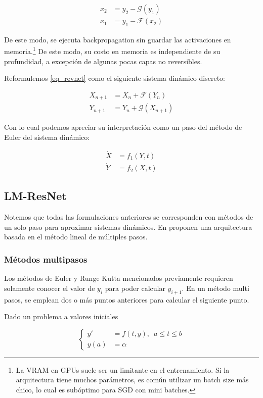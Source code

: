 \documentclass[titlepage,a4paper,oneside]{article}
\begin{document}
\begin{align}
	x_2 &= y_2 - \mathscr{G}(y_1) \\
	x_1 &= y_1 - \mathscr{F}(x_2)
\end{align}

De este modo, se ejecuta backpropagation sin guardar las activaciones en memoria.\footnote{La VRAM en GPUs suele ser un limitante en el entrenamiento. Si la arquitectura tiene muchos parámetros, es común utilizar un batch size más chico, lo cual es subóptimo para SGD con mini batches.} De este modo, su costo en memoria es independiente de su profundidad, a excepción de algunas pocas capas no reversibles.

Reformulemos \ref{eq_revnet} como el siguiente sistema dinámico discreto:

\begin{align}
	X_{n+1} &= X_n + \mathscr{F}(Y_n) \\
	Y_{n+1} &= Y_n + \mathscr{G}(X_{n+1})
\end{align}

Con lo cual podemos apreciar su interpretación como un paso del método de Euler del sistema dinámico:

\begin{align}
	\dot{X} &= f_1(Y, t) \\
	\dot{Y} &= f_2(X, t)
\end{align}

\subsection{LM-ResNet}
Notemos que todas las formulaciones anteriores se corresponden con métodos de un solo paso para aproximar sistemas dinámicos. En \cite{lu18d} proponen una arquitectura basada en el método lineal de múltiples pasos.

\subsubsection{Métodos multipasos}
Los métodos de Euler y Runge Kutta mencionados previamente requieren solamente conocer el valor de $y_i$ para poder calcular $y_{i+1}$. En un método multi pasos, se emplean dos o más puntos anteriores para calcular el siguiente punto.

Dado un problema a valores iniciales

\begin{equation}
\left\{ \begin{aligned}
		y\prime &= f(t,y), \enspace a \leq t \leq b\\
		y(a) &= \alpha
\end{aligned} \right.
\end{equation}
\end{document}
